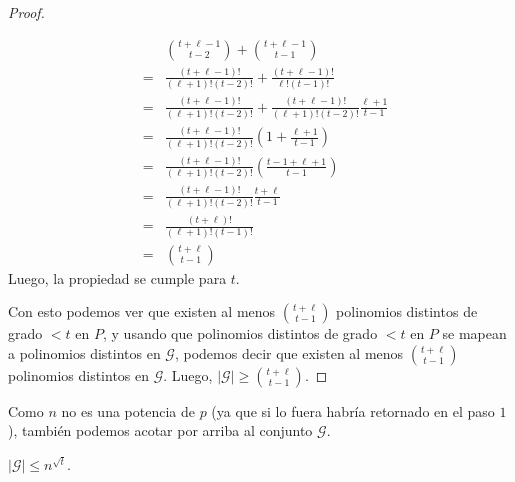 \begin{proof}
\begin{itemize}
\begin{eqnarray}
			& &{{t+\ell -1}\choose{t-2}}+{{t+\ell -1}\choose{t-1}}\nonumber\\
			&= &\frac{(t+\ell -1)!}{(\ell +1)!(t-2)!}+\frac{(t+\ell -1)!}{\ell !(t-1)!}\nonumber\\
			&= &\frac{(t+\ell -1)!}{(\ell +1)!(t-2)!}+\frac{(t+\ell -1)!}{(\ell +1)!(t-2)!}\frac{\ell +1}{t-1}\nonumber\\
			&= &\frac{(t+\ell -1)!}{(\ell +1)!(t-2)!}(1+\frac{\ell +1}{t-1})\nonumber\\
			&= &\frac{(t+\ell -1)!}{(\ell +1)!(t-2)!}(\frac{t-1+\ell +1}{t-1})\nonumber\\
			&= &\frac{(t+\ell -1)!}{(\ell +1)!(t-2)!}\frac{t+\ell }{t-1}\nonumber\\
			&= &\frac{(t+\ell )!}{(\ell +1)!(t-1)!}\nonumber\\
			&=& {{t+\ell }\choose{t-1}}\nonumber
			\end{eqnarray}
			Luego, la propiedad se cumple para $t$.
		\end{itemize}
		Con esto podemos ver que existen al menos ${{t+\ell }\choose{t-1}}$ polinomios distintos de grado $<t$ en $P$, y usando que polinomios distintos de grado $<t$ en $P$ se mapean a polinomios distintos en $\mathcal{G}$, podemos decir que existen al menos ${{t+\ell }\choose{t-1}}$ polinomios distintos en $\mathcal{G}$. Luego, $|\mathcal{G}|\geq {{t+\ell }\choose{t-1}}$.
		
	\end{proof}
	Como $n$ no es una potencia de $p$ (ya que si lo fuera habrí­a retornado en el paso $1$), también podemos acotar por arriba al conjunto $\mathcal{G}$.
	\begin{lemma}
		$|\mathcal{G}|\leq n^{\sqrt{t}}$.
	\end{lemma}
